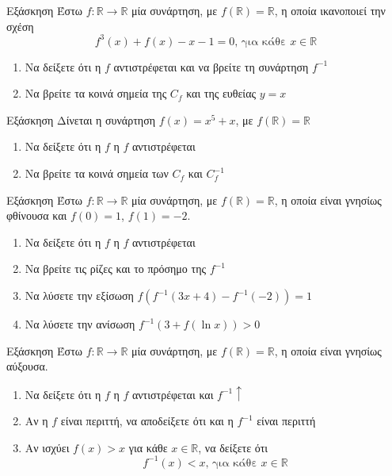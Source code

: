 \documentclass[greek]{beamer}
\begin{document}
\begin{frame}{Εξάσκηση}
 Έστω $f:\mathbb{R}\to\mathbb{R}$ μία συνάρτηση, με $f(\mathbb{R})=\mathbb{R}$, η οποία ικανοποιεί την σχέση
 $$f^3(x)+f(x)-x-1=0\text{, για κάθε }x\in \mathbb{R}$$
 \begin{enumerate}
  \item Να δείξετε ότι η $f$ αντιστρέφεται και να βρείτε τη συνάρτηση $f^{-1}$ \pause
  \item Να βρείτε τα κοινά σημεία της $C_f$ και της ευθείας $y=x$
 \end{enumerate}
\end{frame}

\begin{frame}{Εξάσκηση}
 Δίνεται η συνάρτηση $f(x)=x^5+x$, με $f(\mathbb{R})=\mathbb{R}$
 \begin{enumerate}
  \item Να δείξετε ότι η $f$ η $f$ αντιστρέφεται \pause
  \item Να βρείτε τα κοινά σημεία των $C_f$ και $C_f^{-1}$
 \end{enumerate}
\end{frame}

\begin{frame}{Εξάσκηση}
 Έστω $f:\mathbb{R}\to\mathbb{R}$ μία συνάρτηση, με $f(\mathbb{R})=\mathbb{R}$, η οποία είναι γνησίως φθίνουσα και $f(0)=1$, $f(1)=-2$.
 \begin{enumerate}
  \item Να δείξετε ότι η $f$ η $f$ αντιστρέφεται \pause
  \item Να βρείτε τις ρίζες και το πρόσημο της $f^{-1}$ \pause
  \item Να λύσετε την εξίσωση $f\left(f^{-1}(3x+4)-f^{-1}(-2)\right)=1$ \pause
  \item Να λύσετε την ανίσωση $f^{-1}\left(3+f(\ln x)\right)>0$
 \end{enumerate}
\end{frame}

\begin{frame}{Εξάσκηση}
 Έστω $f:\mathbb{R}\to\mathbb{R}$ μία συνάρτηση, με $f(\mathbb{R})=\mathbb{R}$, η οποία είναι γνησίως αύξουσα.
 \begin{enumerate}
  \item Να δείξετε ότι η $f$ η $f$ αντιστρέφεται και $f^{-1}\uparrow$\pause
  \item Αν η $f$ είναι περιττή, να αποδείξετε ότι και η $f^{-1}$ είναι περιττή \pause
  \item Αν ισχύει $f(x)>x$ για κάθε $x\in\mathbb{R}$, να δείξετε ότι
        $$f^{-1}(x)<x\text{, για κάθε }x\in\mathbb{R}$$
 \end{enumerate}
\end{frame}
\end{document}
